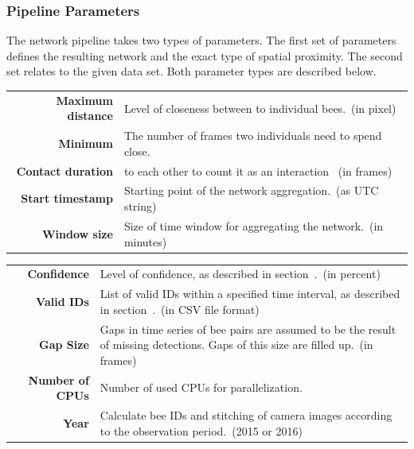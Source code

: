 \subsubsection{Pipeline Parameters}
The network pipeline takes two types of parameters. The first set of parameters defines the resulting network and the exact type of spatial proximity. The second set relates to the given data set. Both parameter types are described below.


\begin{table}[htbp]
\small
\centering
\begin{tabularx}{\textwidth}{@{} r Y @{}}
\textbf{Maximum distance} & Level of closeness between to individual bees.~(in pixel) \vspace{2mm} \\
\textbf{Minimum} & The number of frames two individuals need to spend close.\\
\textbf{Contact duration} &  to each other to count it as an interaction ~(in frames) \vspace{2mm} \\
\textbf{Start timestamp} & Starting point of the network aggregation.~(as UTC string) \vspace{2mm} \\
\textbf{Window size} & Size of time window for aggregating the network.~(in minutes) \vspace{4mm}\\
\end{tabularx}
\end{table}

\begin{table}[htbp]
\small
\centering
\begin{tabularx}{\textwidth}{@{} r Y @{}}
\textbf{Confidence} & Level of confidence, as described in section~.~(in percent) \vspace{2mm}\\
\textbf{Valid IDs} & List of valid IDs within a specified time interval, as described in section~.~(in CSV file format) \vspace{2mm}\\
\textbf{Gap Size} & Gaps in time series of bee pairs are assumed to be the result of missing detections. Gaps of this size are filled up.~(in frames)\vspace{2mm}\\
\textbf{Number of CPUs} & Number of used CPUs for parallelization. \vspace{2mm}\\
\textbf{Year} & Calculate bee IDs and stitching of camera images according to the observation period.~(2015 or 2016)\\
\end{tabularx}
\end{table}

